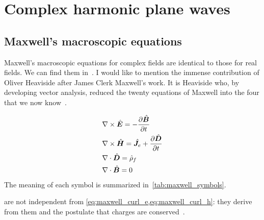 \FloatBarrier
\section{Complex harmonic plane waves}

\subsection{Maxwell's macroscopic equations}
\label{sec:maxwell_macroscopic}

Maxwell's macroscopic equations for complex fields are identical to those for real fields.
We can find them in~\textcite{jackson1998classical}.
I would like to mention the immense contribution of Oliver Heaviside after James Clerk Maxwell's work.
It is Heaviside who, by developing vector analysis, reduced the twenty equations of Maxwell into the four that we now know~\parencite{nahin2002oliver}.

\begin{subequations}
    \label{eq:complex_maxwell_macroscopic}
    \begin{align}
        &\nabla \times \hat{\bm{E}} = -\frac{\partial \hat{\bm{B}}}{\partial t}
        \label{eq:maxwell_curl_e}
        \\
        &\nabla \times \hat{\bm{H}} = \hat{\bm{J}}_e + \frac{\partial \hat{\bm{D}}}{\partial t}
        \label{eq:maxwell_curl_h}
        \\
        &\nabla \cdot \hat{\bm{D}}  = \hat{\rho}_f
        \label{eq:maxwell_div_d}
        \\
        &\nabla \cdot \hat{\bm{B}}  = 0
        \label{eq:maxwell_div_b}
    \end{align}
\end{subequations}
The meaning of each symbol is summarized in~\cref{tab:maxwell_symbols}.


 are not independent from
\cref{eq:maxwell_curl_e,eq:maxwell_curl_h}: they derive from them and the postulate that charges are conserved~\parencite{stratton1941electromagnetic}.

